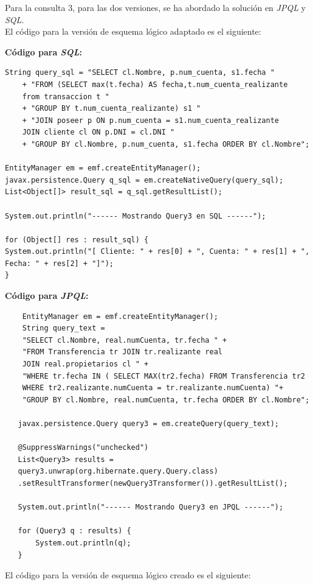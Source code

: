 \documentclass[11pt,a4paper]{article}
\begin{document}
\bigbreak
Para la consulta 3, para las dos versiones, se ha abordado la solución en \emph{JPQL} y \textit{SQL}. \\
El código para la versión de esquema lógico adaptado es el siguiente:

\textbf{Código para \textit{SQL}:}
\begin{lstlisting}
String query_sql = "SELECT cl.Nombre, p.num_cuenta, s1.fecha "
	+ "FROM (SELECT max(t.fecha) AS fecha,t.num_cuenta_realizante 
	from transaccion t "
	+ "GROUP BY t.num_cuenta_realizante) s1 "
	+ "JOIN poseer p ON p.num_cuenta = s1.num_cuenta_realizante 
	JOIN cliente cl ON p.DNI = cl.DNI "
	+ "GROUP BY cl.Nombre, p.num_cuenta, s1.fecha ORDER BY cl.Nombre";

EntityManager em = emf.createEntityManager();
javax.persistence.Query q_sql = em.createNativeQuery(query_sql);
List<Object[]> result_sql = q_sql.getResultList();

System.out.println("------ Mostrando Query3 en SQL ------");

for (Object[] res : result_sql) {
System.out.println("[ Cliente: " + res[0] + ", Cuenta: " + res[1] + ", Fecha: " + res[2] + "]");
}
\end{lstlisting}

\bigbreak
\textbf{Código para \textit{JPQL}:}

\begin{lstlisting}
	EntityManager em = emf.createEntityManager();
	String query_text = 
    "SELECT cl.Nombre, real.numCuenta, tr.fecha " +
    "FROM Transferencia tr JOIN tr.realizante real 
    JOIN real.propietarios cl " + 
    "WHERE tr.fecha IN ( SELECT MAX(tr2.fecha) FROM Transferencia tr2 
    WHERE tr2.realizante.numCuenta = tr.realizante.numCuenta) "+
    "GROUP BY cl.Nombre, real.numCuenta, tr.fecha ORDER BY cl.Nombre";

   javax.persistence.Query query3 = em.createQuery(query_text);

   @SuppressWarnings("unchecked")
   List<Query3> results = 
   query3.unwrap(org.hibernate.query.Query.class)
   .setResultTransformer(newQuery3Transformer()).getResultList();

   System.out.println("------ Mostrando Query3 en JPQL ------");

   for (Query3 q : results) {
       System.out.println(q);
   }
\end{lstlisting}

El código para la versión de esquema lógico creado es el siguiente:
\end{document}
